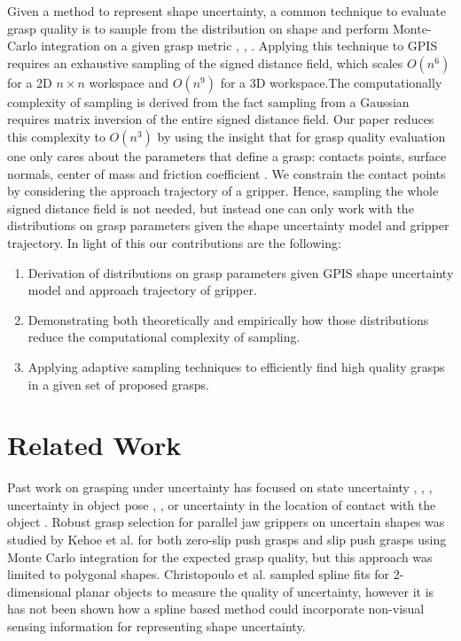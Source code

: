 \documentclass[letterpaper, 10 pt, conference]{ieeeconf}  %
\begin{document}
Given a method to represent shape uncertainty, a common technique to evaluate grasp quality is to sample from the distribution on shape and perform Monte-Carlo integration on a given grasp metric \cite{kehoe2012estimating}, \cite{kehoe2012toward}, \cite{christopoulos2007handling}. Applying this technique to GPIS requires an exhaustive sampling of the signed distance field, which scales $O(n^6)$ for a 2D $n \times n$ workspace and $O(n^9)$ for a 3D workspace.The computationally complexity of sampling is derived from the fact sampling from a Gaussian requires matrix inversion of the entire signed distance field. Our paper reduces this complexity to $O(n^3)$ by using the insight that for grasp quality evaluation one only cares about the parameters that define a grasp: contacts points, surface normals, center of mass and friction coefficient \cite{pokorny2013classical}. 
We constrain the contact points by considering the approach trajectory of a gripper.  Hence, sampling the whole signed distance field is not needed, but instead one can only work with the distributions on grasp parameters given the shape uncertainty model and gripper trajectory. In light of this our contributions are the following:
 
\begin{enumerate}
	\item Derivation of  distributions on grasp parameters given GPIS shape uncertainty model and approach trajectory of gripper.%
	\item  Demonstrating both theoretically and empirically how those distributions reduce the computational complexity of sampling.%
	\item Applying adaptive sampling techniques to efficiently find high quality grasps in a given set of proposed grasps. 
\end{enumerate}
 
\section{Related Work}

 Past work on grasping under uncertainty has focused on state uncertainty \cite{goldberg1990bayesian}, \cite{goldberg1990stochastic}, \cite{stulp2011learning},  uncertainty in object pose \cite{christopoulos2007handling}, \cite{felip2009robust}, \cite{kim2012physically} or uncertainty in the location of contact with the object \cite{zheng2005}. Robust grasp selection for parallel jaw grippers on uncertain shapes was studied by Kehoe et al. for both zero-slip push grasps \cite{kehoe2012toward} and slip push grasps \cite{kehoe2012estimating} using Monte Carlo integration for the expected grasp quality, but this approach was limited to polygonal shapes.  Christopoulo et al. sampled spline fits for 2-dimensional planar objects to measure the quality of uncertainty, however it is has not been shown how a spline based method could incorporate non-visual sensing information for representing shape uncertainty.
 
\end{document}
